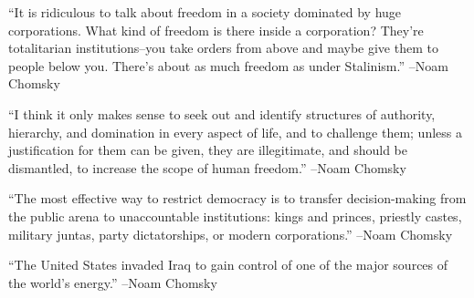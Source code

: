 \documentclass{article}%
\begin{document}
\linebreak%
\vspace{1mm}%
\begin{minipage}{\textwidth}%
\flushleft%
“It is ridiculous to talk about freedom in a society dominated by huge corporations. What kind of freedom is there inside a corporation? They're totalitarian institutions–you take orders from above and maybe give them to people below you. There's about as much freedom as under Stalinism.”%
\linebreak%
\vspace{1mm}%
–Noam Chomsky%
\linebreak%
\vspace{1mm}%
\end{minipage}%
\linebreak%
\vspace{1mm}%
\begin{minipage}{\textwidth}%
\flushleft%
“I think it only makes sense to seek out and identify structures of authority, hierarchy, and domination in every aspect of life, and to challenge them; unless a justification for them can be given, they are illegitimate, and should be dismantled, to increase the scope of human freedom.”%
\linebreak%
\vspace{1mm}%
–Noam Chomsky%
\linebreak%
\vspace{1mm}%
\end{minipage}%
\linebreak%
\vspace{1mm}%
\begin{minipage}{\textwidth}%
\flushleft%
“The most effective way to restrict democracy is to transfer decision{-}making from the public arena to unaccountable institutions: kings and princes, priestly castes, military juntas, party dictatorships, or modern corporations.”%
\linebreak%
\vspace{1mm}%
–Noam Chomsky%
\linebreak%
\vspace{1mm}%
\end{minipage}%
\linebreak%
\vspace{1mm}%
\begin{minipage}{\textwidth}%
\flushleft%
“The United States invaded Iraq to gain control of one of the major sources of the world's energy.”%
\linebreak%
\vspace{1mm}%
–Noam Chomsky%
\linebreak%
\vspace{1mm}%
\end{minipage}%
\end{document}

